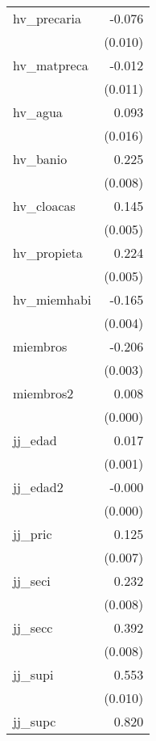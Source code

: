{\begin{longtable}{l*{1}{D{.}{.}{-1}}}
hv\_precaria &      -0.076\sym{***}\\
            &     (0.010)         \\
\addlinespace
hv\_matpreca &      -0.012         \\
            &     (0.011)         \\
\addlinespace
hv\_agua     &       0.093\sym{***}\\
            &     (0.016)         \\
\addlinespace
hv\_banio    &       0.225\sym{***}\\
            &     (0.008)         \\
\addlinespace
hv\_cloacas  &       0.145\sym{***}\\
            &     (0.005)         \\
\addlinespace
hv\_propieta &       0.224\sym{***}\\
            &     (0.005)         \\
\addlinespace
hv\_miemhabi &      -0.165\sym{***}\\
            &     (0.004)         \\
\addlinespace
miembros    &      -0.206\sym{***}\\
            &     (0.003)         \\
\addlinespace
miembros2   &       0.008\sym{***}\\
            &     (0.000)         \\
\addlinespace
jj\_edad     &       0.017\sym{***}\\
            &     (0.001)         \\
\addlinespace
jj\_edad2    &      -0.000\sym{***}\\
            &     (0.000)         \\
\addlinespace
jj\_pric     &       0.125\sym{***}\\
            &     (0.007)         \\
\addlinespace
jj\_seci     &       0.232\sym{***}\\
            &     (0.008)         \\
\addlinespace
jj\_secc     &       0.392\sym{***}\\
            &     (0.008)         \\
\addlinespace
jj\_supi     &       0.553\sym{***}\\
            &     (0.010)         \\
\addlinespace
jj\_supc     &       0.820\sym{***}\\

\end{longtable}}
